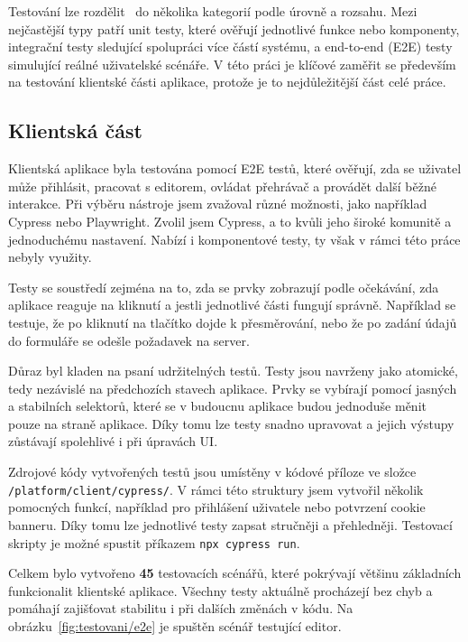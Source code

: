 Testování lze rozdělit~\cite{meszaros_2007} do několika kategorií podle úrovně a rozsahu. 
Mezi nejčastější typy patří unit testy, které ověřují jednotlivé funkce nebo komponenty, integrační testy sledující spolupráci více částí systému, a end-to-end (E2E) testy simulující reálné uživatelské scénáře. 
V této práci je klíčové zaměřit se především na testování klientské části aplikace, protože je to nejdůležitější část celé práce.

\subsection{Klientská část}

Klientská aplikace byla testována pomocí E2E testů, které ověřují, zda se uživatel může přihlásit, pracovat s editorem, ovládat přehrávač a provádět další běžné interakce. 
Při výběru nástroje jsem zvažoval různé možnosti, jako například Cypress nebo Playwright. 
Zvolil jsem Cypress, a to kvůli jeho široké komunitě a jednoduchému nastavení.
Nabízí i komponentové testy, ty však v rámci této práce nebyly využity.

Testy se soustředí zejména na to, zda se prvky zobrazují podle očekávání, zda aplikace reaguje na kliknutí a jestli jednotlivé části fungují správně.
Například se testuje, že po kliknutí na tlačítko dojde k přesměrování, nebo že po zadání údajů do formuláře se odešle požadavek na server.

Důraz byl kladen na psaní udržitelných testů. 
Testy jsou navrženy jako atomické, tedy nezávislé na předchozích stavech aplikace. 
Prvky se vybírají pomocí jasných a stabilních selektorů, které se v budoucnu aplikace budou jednoduše měnit pouze na straně aplikace.
Díky tomu lze testy snadno upravovat a jejich výstupy zůstávají spolehlivé i při úpravách UI.


Zdrojové kódy vytvořených testů jsou umístěny v kódové příloze ve složce \texttt{/platform/client/cypress/}. 
V rámci této struktury jsem vytvořil několik pomocných funkcí, například pro přihlášení uživatele nebo potvrzení cookie banneru. 
Díky tomu lze jednotlivé testy zapsat stručněji a přehledněji.
Testovací skripty je možné spustit příkazem \verb|npx cypress run|.

Celkem bylo vytvořeno \textbf{45} testovacích scénářů, které pokrývají většinu základních funkcionalit klientské aplikace. 
Všechny testy aktuálně procházejí bez chyb a pomáhají zajišťovat stabilitu i při dalších změnách v kódu.
Na obrázku~\ref{fig:testovani/e2e} je spuštěn scénář testující editor.

